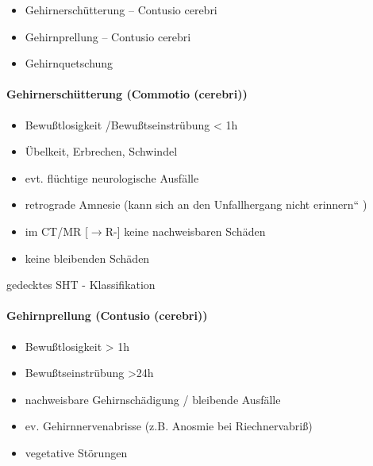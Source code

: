 \documentclass{article}
\begin{document}
\begin{itemize}
\item Gehirnersch\"utterung  {}-- Contusio cerebri

\item Gehirnprellung  {}-- Contusio cerebri

\item Gehirnquetschung

\end{itemize}
\paragraph[Gehirnersch\"utterung (Commotio
(cerebri))]{Gehirnersch\"utterung (Commotio (cerebri))}
\begin{itemize}
\item  Bewu{\ss}tlosigkeit /Bewu{\ss}tseinstr\"ubung {\textless}  1h

\item \"Ubelkeit, Erbrechen, Schwindel

\item evt. fl\"uchtige neurologische Ausf\"alle

\item retrograde  Amnesie  ({\quotedblbase}kann sich an den
Unfallhergang nicht erinnern{\textquotedblleft} )

\end{itemize}
\begin{itemize}
\item im CT/MR [${\rightarrow}$R{}-\pageref{bkm:LexComputertomographie}]
keine nachweisbaren Sch\"aden

\item keine  bleibenden Sch\"aden

\end{itemize}
gedecktes SHT - Klassifikation

\paragraph[Gehirnprellung (Contusio (cerebri))]{Gehirnprellung (Contusio
(cerebri))}
\begin{itemize}
\item Bewu{\ss}tlosigkeit  {\textgreater}  1h

\item Bewu{\ss}tseinstr\"ubung {\textgreater}24h

\item nachweisbare Gehirnsch\"adigung / bleibende  Ausf\"alle

\item ev. Gehirnnervenabrisse (z.B. Anosmie  bei  Riechnervabri{\ss})

\item  vegetative St\"orungen

\end{itemize}
\end{document}
